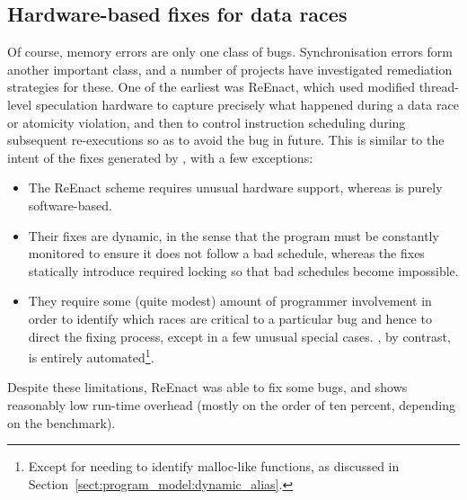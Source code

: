 \subsection{Hardware-based fixes for data races}
Of course, memory errors are only one class of bugs.  Synchronisation
errors form another important class, and a number of projects have
investigated remediation strategies for these.  One of the earliest
was ReEnact\cite{Prvulovic2003a}, which used modified thread-level
speculation hardware to capture precisely what happened during a data
race or atomicity violation, and then to control instruction
scheduling during subsequent re-executions so as to avoid the bug in
future.  This is similar to the intent of the fixes generated by
{\technique}, with a few exceptions:

\begin{itemize}
\item The ReEnact scheme requires unusual hardware support, whereas
  {\technique} is purely software-based.
\item Their fixes are dynamic, in the sense that the program must be
  constantly monitored to ensure it does not follow a bad schedule,
  whereas the {\technique} fixes statically introduce required locking
  so that bad schedules become impossible.
\item They require some (quite modest) amount of programmer
  involvement in order to identify which races are critical to a
  particular bug and hence to direct the fixing process, except in a
  few unusual special cases.  {\Implementation}, by contrast, is
  entirely automated\footnote{Except for needing to identify
    malloc-like functions, as discussed in
    Section~\ref{sect:program_model:dynamic_alias}.}.
\end{itemize}

Despite these limitations, ReEnact was able to fix some bugs, and
shows reasonably low run-time overhead (mostly on the order of ten
percent, depending on the benchmark).

